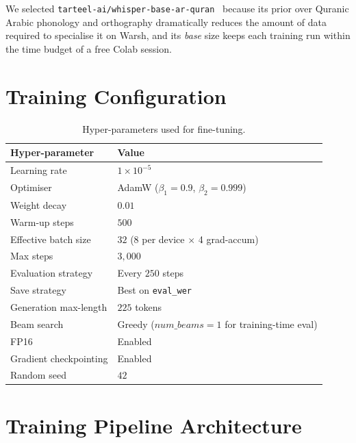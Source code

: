 \documentclass[12pt,a4paper]{report}
\begin{document}
We selected \texttt{tarteel-ai/whisper-base-ar-quran}~\cite{tarteelmodel}
because its prior over Quranic Arabic phonology and orthography
dramatically reduces the amount of data required to specialise it on
Warsh, and its \emph{base} size keeps each training run within the time
budget of a free Colab session.

\section{Training Configuration}

\begin{table}[H]
  \centering
  \caption{Hyper-parameters used for fine-tuning.}
  \label{tab:mt_hyperparams}
  \renewcommand{\arraystretch}{1.3}
  \begin{tabular}{ll}
    \toprule
    \textbf{Hyper-parameter} & \textbf{Value} \\
    \midrule
    Learning rate                & $1\times 10^{-5}$ \\
    Optimiser                    & AdamW ($\beta_1=0.9$, $\beta_2=0.999$) \\
    Weight decay                 & $0.01$ \\
    Warm-up steps                & $500$ \\
    Effective batch size         & $32$ (8 per device $\times$ 4 grad-accum) \\
    Max steps                    & $3{,}000$ \\
    Evaluation strategy          & Every $250$ steps \\
    Save strategy                & Best on \texttt{eval\_wer} \\
    Generation max-length        & $225$ tokens \\
    Beam search                  & Greedy ($num\_beams=1$ for training-time eval) \\
    FP16                         & Enabled \\
    Gradient checkpointing       & Enabled \\
    Random seed                  & $42$ \\
    \bottomrule
  \end{tabular}
\end{table}

\section{Training Pipeline Architecture}
\end{document}
